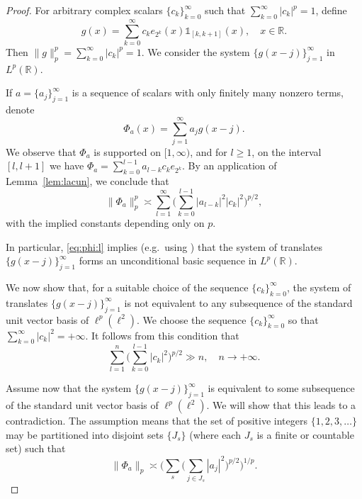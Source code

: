 \documentclass[reqno,a4paper,12pt]{amsart}
\numberwithin{equation}{section}
\numberwithin{figure}{section}
\newcommand\R{\mathbb{R}}
\newcommand\1{\mathds{1}}
\renewcommand\ge{\geqslant}
\theoremstyle{plain}
\newcommand{\lemref}[1]{Lemma~\ref{#1}}
\theoremstyle{definition}
\begin{document}
\begin{proof}
For arbitrary complex scalars $\{c_k\}_{k=0}^\infty$ such that $\sum_{k=0}^\infty |c_k|^p =1$, define
\begin{equation}
g (x) = \sum_{k=0}^\infty c_k e_{2^k}(x) \1_{[k, k+1]}(x), \quad x \in \R.
\end{equation}
Then $\|g\|_p^p = \sum_{k=0}^\infty |c_k|^p = 1$.
We consider the system $\{g(x-j)\}_{j=1}^{\infty}$ in $L^p(\R)$.


If  $a=\{a_j\}_{j=1}^\infty$ is a sequence of scalars with only finitely many nonzero terms, denote
\begin{equation}
\Phi_a (x) = \sum_{j=1}^\infty a_j g(x-j).
\end{equation}
We observe that $\Phi_a$ is supported on $[1, \infty)$, and for $l \ge 1$, on the interval $[l,l+1]$ we have
$\Phi_a  = \sum_{k=0}^{l-1} a_{l-k} c_k e_{2^k}$. By an application of \lemref{lem:lacun}, we conclude that
\begin{equation}
\label{eq:phi:l}
\|\Phi_a\|_p^p \asymp
\sum_{l=1}^{\infty}
\Big( \sum_{k=0}^{l-1} |a_{l-k}|^2 |c_k|^2 \Big)^{p/2},
\end{equation}
with the implied constants depending only on $p$. 


In particular, \eqref{eq:phi:l} implies (e.g.\ using \cite[Propositions 1.1.9 and 3.1.3]{AK16}) that the system of translates $\{g(x-j)\}_{j=1}^{\infty}$ forms an unconditional basic sequence in $L^p(\R)$.


We now show that, for a suitable choice of the sequence $\{c_k\}_{k=0}^{\infty}$, the system of translates $\{g(x-j)\}_{j=1}^{\infty}$ is not equivalent to any subsequence of the standard unit vector basis of $\ell^p(\ell^2)$. We choose the sequence $\{c_k\}_{k=0}^{\infty}$ so that
$\sum_{k=0}^\infty |c_k|^2 = +\infty$. It follows from this condition that
\begin{equation}
\label{eq:ck:l}
\sum_{l=1}^{n} \Big( \sum_{k=0}^{l-1}
|c_k|^2 \Big)^{p/2} \gg n, \quad
n \to + \infty.
\end{equation}

Assume now that the system  $\{g(x-j)\}_{j=1}^{\infty}$ is equivalent to some subsequence of the standard unit vector basis of $\ell^p(\ell^2)$. We will show that this leads to a contradiction. The assumption means that the set of positive integers $\{1,2,3,\dots\}$ may be partitioned into disjoint sets $\{J_s\}$ (where each $J_s$ is a finite or countable set) such that
\begin{equation}
\label{eq:phi:x}
\|\Phi_a\|_p \asymp \Big( \sum_{s} \Big(\sum_{j \in J_s} |a_j|^2\Big)^{p/2} \Big)^{1/p}.
\end{equation}


\end{proof}
\end{document}
